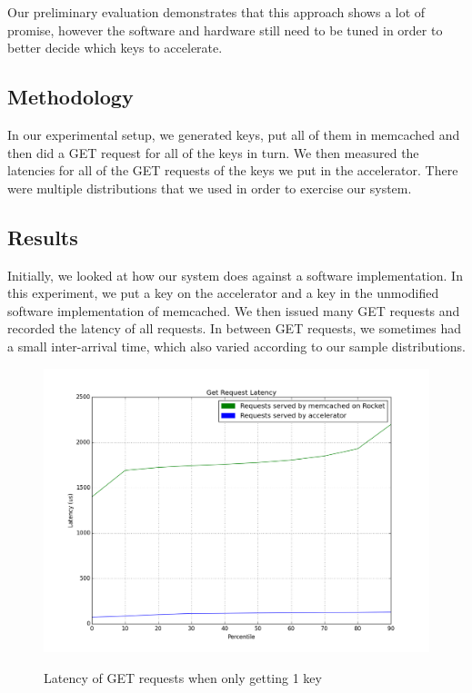 Our preliminary evaluation demonstrates that this approach shows a lot of
promise, however the software and hardware still need to be tuned in order to
better decide which keys to accelerate.

\subsection{Methodology}

In our experimental setup, we generated keys, put all of them in memcached and
then did a GET request for all of the keys in turn. We then measured the
latencies for all of the GET requests of the keys we put in the accelerator.
There were multiple distributions that we used in order to exercise our system.

\subsection{Results}

Initially, we looked at how our system does against a software implementation.
In this experiment, we put a key on the accelerator and a key in the unmodified
software implementation of memcached. We then issued many GET requests and
recorded the latency of all requests. In between GET requests, we sometimes had
a small inter-arrival time, which also varied according to our sample
distributions.

\begin{figure}[t]
\begin{center}
\label{fig:one-req}
\includegraphics[width=\linewidth]{graph.png}
\caption{Latency of GET requests when only getting 1 key}
\end{center}
\end{figure}

